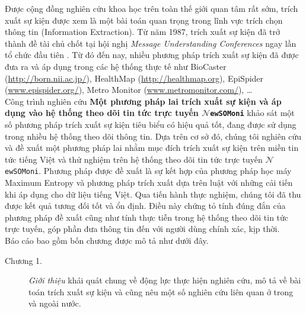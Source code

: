 %
\clearpage
\thispagestyle{empty}
%
\begin{preface}
	\bigskip
    \noindent Được cộng đồng nghiên cứu khoa học trên toàn thế giới quan tâm rất
    sớm, trích xuất sự kiện được xem là một bài toán quan trọng trong lĩnh vực
    trích chọn thông tin (Information Extraction). Từ năm 1987, trích xuất sự
    kiện đã trở thành đề tài chủ chốt tại hội nghị \emph{Message Understanding
    Conferences} ngay lần tổ
	chức đầu tiên \cite{RB96}. Từ đó đến nay, nhiều phương pháp trích
    xuất sự kiện đã được đưa ra  và áp dụng trong các hệ thống thực tế như
    BioCaster (\href{http://born.nii.ac.jp/}{http://born.nii.ac.jp/}), HealthMap
    (\href{http://healthmap.org}{http://healthmap.org}), EpiSpider
    (\href{http://www.epispider.org/}{www.epispider.org/}), Metro
    Monitor (\href{ http://www.metromonitor.com/}{www.metromonitor.com/}), \ldots \\
   \noindent Công trình nghiên cứu \textbf{Một phương pháp lai trích xuất sự kiện và áp
   dụng vào hệ thống theo dõi tin tức trực tuyến  $\mathcal{N}$\texttt{ewSOMoni}} khảo sát một số phương pháp trích xuất sự
    kiện tiêu biểu có hiệu quả tốt, đang được sử dụng trong nhiều hệ thống
    theo dõi thông tin. Dựa trên cơ sở đó, chúng tôi  nghiên cứu và đề xuất một phương
    pháp lai nhằm mục đích trích xuất sự kiện trên miền tin tức tiếng Việt và
    thử nghiệm trên hệ thống theo dõi tin tức trực tuyến
    $\mathcal{N}$\texttt{ewSOMoni}. Phương pháp được đề xuất là sự kết hợp của
    phương pháp học máy Maximum Entropy và phương pháp trích xuất dựa trên
    luật với những cải tiến khi áp dụng cho dữ liệu tiếng Việt. Qua tiến hành
    thực nghiệm, chúng tôi đã thu được kết quả tương đối tốt và ổn định. Điều
    này chứng tỏ tính đúng đắn của phương pháp đề xuất cũng như tính thực tiễn
    trong hệ thống theo dõi tin tức trực tuyến, góp phần đưa thông tin đến với
    người dùng chính xác, kịp thời.
    \\[0.5cm]
	\noindent Báo cáo bao gồm bốn chương được mô tả như dưới đây.

	\begin{description}
		\item[Chương 1.] \emph{Giới thiệu} khái quát chung về động lực thực hiện
		nghiên cứu, mô tả về bài toán trích xuất sự kiện và cũng nêu một số
		nghiên cứu liên quan ở trong và ngoài nước. 



\end{description}
\end{preface}
